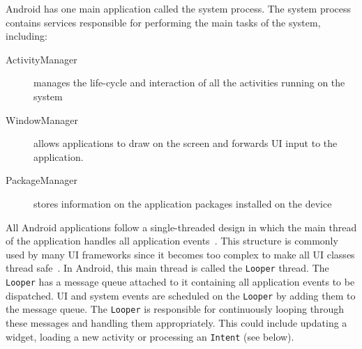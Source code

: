 \documentclass{acm_proc_article-sp}
\begin{document}
Android has one main application called the system process. The system process contains services responsible for performing the main
tasks of the system, including:
\vspace{-10pt}
\begin{description}
 \item [ActivityManager] manages the life-cycle and interaction of all the activities running on the system
 \item [WindowManager] allows applications to draw on the screen and forwards UI input to the application.
 \item [PackageManager] stores information on the application \linebreak packages installed on the device
\end{description}
\vspace{-5pt}
All Android applications follow a single-threaded design in which the main thread of the application handles all application
events~\cite{AndroidDocs}. This structure is commonly used by many UI frameworks since it becomes too complex to make all UI classes thread
safe~\cite{SingleThread}. In Android, this main thread is called the \texttt{Looper} thread. The \texttt{Looper} has a message queue
attached to it containing all application events to be dispatched. UI and system events are scheduled on the \texttt{Looper} by adding
them to the message queue. The \texttt{Looper} is responsible for continuously looping through these messages and handling them
appropriately. This could include updating a widget, loading a new activity or processing an \texttt{Intent} (see below).
\end{document}
